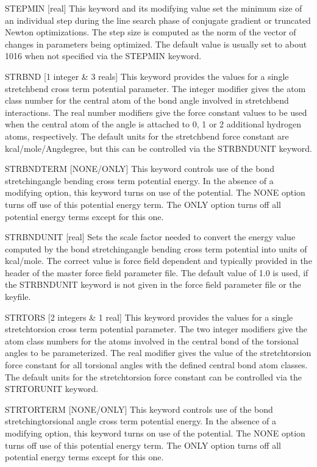 \documentclass[letterpaper,11pt,english]{sphinxmanual}
\begin{document}
STEPMIN {[}real{]}     This keyword and its modifying value set the minimum size of an individual step during the line search phase of conjugate gradient or truncated Newton optimizations. The step size is computed as the norm of the vector of changes in parameters being optimized. The default value is usually set to about 10\sphinxhyphen{}16 when not specified via the STEPMIN keyword.

STRBND {[}1 integer \& 3 reals{]}     This keyword provides the values for a single stretch\sphinxhyphen{}bend cross term potential parameter. The integer modifier gives the atom class number for the central atom of the bond angle involved in stretch\sphinxhyphen{}bend interactions. The real number modifiers give the force constant values to be used when the central atom of the angle is attached to 0, 1 or 2 additional hydrogen atoms, respectively. The default units for the stretch\sphinxhyphen{}bend force constant are kcal/mole/Ang\sphinxhyphen{}degree, but this can be controlled via the STRBNDUNIT keyword.

STRBNDTERM {[}NONE/ONLY{]}     This keyword controls use of the bond stretching\sphinxhyphen{}angle bending cross term potential energy. In the absence of a modifying option, this keyword turns on use of the potential. The NONE option turns off use of this potential energy term. The ONLY option turns off all potential energy terms except for this one.

STRBNDUNIT {[}real{]}     Sets the scale factor needed to convert the energy value computed by the bond stretching\sphinxhyphen{}angle bending cross term potential into units of kcal/mole. The correct value is force field dependent and typically provided in the header of the master force field parameter file. The default value of 1.0 is used, if the STRBNDUNIT keyword is not given in the force field parameter file or the keyfile.

STRTORS {[}2 integers \& 1 real{]}     This keyword provides the values for a single stretch\sphinxhyphen{}torsion cross term potential parameter. The two integer modifiers give the atom class numbers for the atoms involved in the central bond of the torsional angles to be parameterized. The real modifier gives the value of the stretch\sphinxhyphen{}torsion force constant for all torsional angles with the defined central bond atom classes. The default units for the stretch\sphinxhyphen{}torsion force constant can be controlled via the STRTORUNIT keyword.

STRTORTERM {[}NONE/ONLY{]}     This keyword controls use of the bond stretching\sphinxhyphen{}torsional angle cross term potential energy. In the absence of a modifying option, this keyword turns on use of the potential. The NONE option turns off use of this potential energy term. The ONLY option turns off all potential energy terms except for this one.
\end{document}
